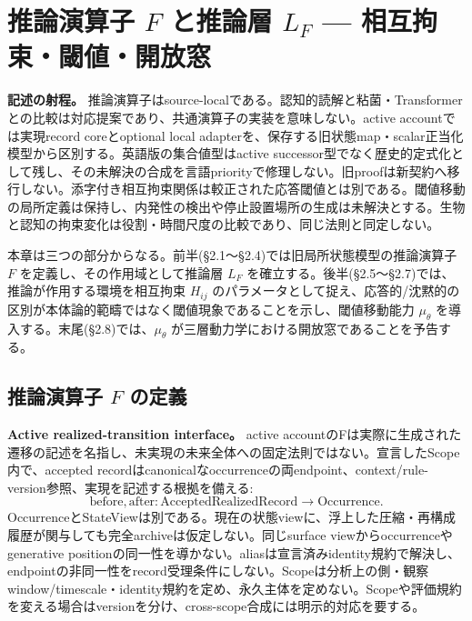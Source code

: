 \section{推論演算子 $F$ と推論層 $L_F$ — 相互拘束・閾値・開放窓}

\noindent\textbf{記述の射程。} 推論演算子はsource-localである。認知的読解と粘菌・Transformerとの比較は対応提案であり、共通演算子の実装を意味しない。active accountでは実現record coreとoptional local adapterを、保存する旧状態map・scalar正当化模型から区別する。英語版の集合値型はactive successor型でなく歴史的定式化として残し、その未解決の合成を言語priorityで修理しない。旧proofは新契約へ移行しない。添字付き相互拘束関係は較正された応答閾値とは別である。閾値移動の局所定義は保持し、内発性の検出や停止設置場所の生成は未解決とする。生物と認知の拘束変化は役割・時間尺度の比較であり、同じ法則と同定しない。



本章は三つの部分からなる。前半(\S{}2.1〜\S{}2.4)では旧局所状態模型の推論演算子 $F$ を定義し、その作用域として推論層 $L_F$ を確立する。後半(\S{}2.5〜\S{}2.7)では、推論が作用する環境を相互拘束 $H_{ij}$ のパラメータとして捉え、応答的/沈黙的の区別が本体論的範疇ではなく閾値現象であることを示し、閾値移動能力 $\mu_\theta$ を導入する。末尾(\S{}2.8)では、$\mu_\theta$ が三層動力学における開放窓であることを予告する。

\bigskip


\subsection{推論演算子 $F$ の定義}


\noindent\textbf{Active realized-transition interface。} active accountのFは実際に生成された遷移の記述を名指し、未実現の未来全体への固定法則ではない。宣言したScope内で、accepted recordはcanonicalなoccurrenceの両endpoint、context/rule-version参照、実現を記述する根拠を備える:
\[
\mathrm{before},\mathrm{after}:\mathrm{AcceptedRealizedRecord}\to\mathrm{Occurrence}.
\]
OccurrenceとStateViewは別である。現在の状態viewに、浮上した圧縮・再構成履歴が関与しても完全archiveは仮定しない。同じsurface viewからoccurrenceやgenerative positionの同一性を導かない。aliasは宣言済みidentity規約で解決し、endpointの非同一性をrecord受理条件にしない。Scopeは分析上の側・観察window/timescale・identity規約を定め、永久主体を定めない。Scopeや評価規約を変える場合はversionを分け、cross-scope合成には明示的対応を要する。

